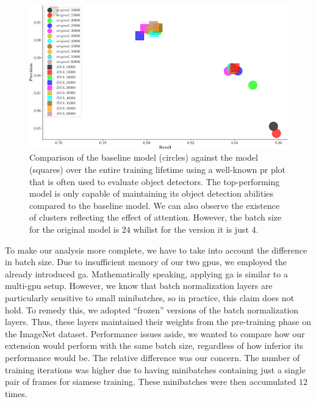 \begin{figure}[t]
    \centerline{\includegraphics[width=\linewidth]{figures/siamese_tracking/tracker_cmp_160_2x12_vs_160_2x2_DSA_rec_prec.pdf}}
    \caption[\gls{dsa} evaluation - secondary metrics]{Comparison of the baseline model (circles) against the \dsamodel{} model (squares) over the entire training lifetime using a well-known \gls{pr} plot that is often used to evaluate object detectors. The top-performing \dsamodel{} model is only capable of maintaining its object detection abilities compared to the baseline model. We can also observe the existence of clusters reflecting the effect of attention. However, the batch size for the original model is $24$ whilist for the \dsamodel{} version it is just $4$.}
    \label{fig:OrigVsDSA_160RPN_Prec_Rec}
\end{figure}

To make our analysis more complete, we have to take into account the difference in batch size. Due to insufficient memory of our two \glspl{gpu}, we employed the already introduced \gls{ga}. Mathematically speaking, applying \gls{ga} is similar to a multi-\gls{gpu} setup. However, we know that batch normalization layers are particularly sensitive to small minibatches, so in practice, this claim does not hold. To remedy this, we adopted ``frozen'' versions of the batch normalization layers. Thus, these layers maintained their weights from the pre-training phase on the ImageNet dataset. Performance issues aside, we wanted to compare how our extension would perform with the same batch size, regardless of how inferior its performance would be. The relative difference was our concern. The number of training iterations was higher due to having minibatches containing just a single pair of frames for siamese training. These minibatches were then accumulated $12$ times.

